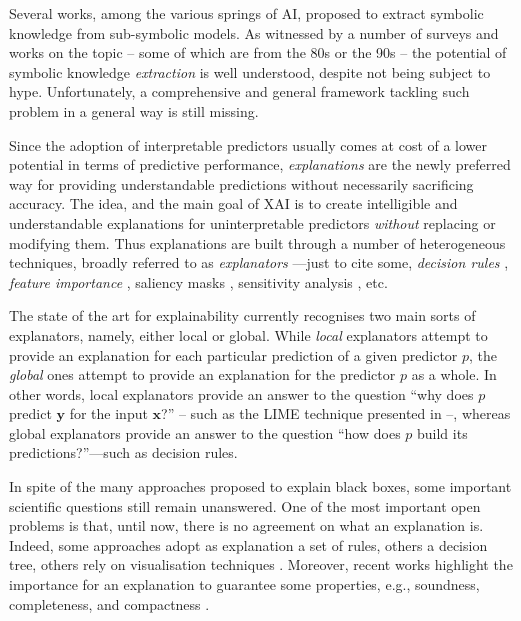 \documentclass[12pt,a4paper,openright,twoside]{book}
\begin{document}
Several works, among the various springs of AI, proposed to extract symbolic knowledge from sub-symbolic models.
%
As witnessed by a number of surveys \cite{GuidottiMRTGP19, GarcezBRFHIKLMS15, AndrewsDT95, GarcezBG01} and works on the topic \cite{BolognaH18, BolognaH16, FrosstH17, JohanssonN09, KrishnanSB1999, HruschkaE2006, ZhouZYS1983, CravenS95, AugastaK12, SatoT2002, KahramanliA09a} -- some of which are from the 80s or the 90s -- the potential of symbolic knowledge \emph{extraction} is well understood, despite not being subject to hype.
%
Unfortunately, a comprehensive and general framework tackling such problem in a general way is still missing.


Since the adoption of interpretable predictors usually comes at cost of a lower potential in terms of predictive performance, \emph{explanations} are the newly preferred way for providing understandable predictions without necessarily sacrificing accuracy.
%
The idea, and the main goal of XAI is to create intelligible and understandable explanations for uninterpretable predictors \emph{without} replacing or modifying them.
%
Thus explanations are built through a number of heterogeneous techniques, broadly referred to as \emph{explanators} \cite{GuidottiMRTGP19}---just to cite some, \emph{decision rules} \cite{Augasta2012}, \emph{feature importance} \cite{tolomei2017interpretable}, saliency masks \cite{FongV17}, sensitivity analysis \cite{SundararajanTY17}, etc.

The state of the art for explainability currently recognises two main sorts of explanators, namely, either local or global. 
%
While \emph{local} explanators attempt to provide an explanation for each particular prediction of a given predictor $p$, the \emph{global} ones attempt to provide an explanation for the predictor $p$ as a whole.
%
In other words, local explanators provide an answer to the question ``why does $p$ predict $\mathbf{y}$ for the input $\mathbf{x}$?'' -- such as the LIME technique presented in \cite{RibeiroSG16} --, whereas global explanators provide an answer to the question ``how does $p$ build its predictions?''---such as decision rules.

In spite of the many approaches proposed to explain black boxes, some important scientific questions still remain unanswered. 
%
One of the most important open problems is that, until now, there is no agreement on what an explanation is. 
%
Indeed, some approaches adopt as explanation a set of rules, others a decision tree, others rely on visualisation techniques \cite{GuidottiMRTGP19}. 
%
Moreover, recent works highlight the importance for an explanation to guarantee some properties, e.g., soundness, completeness, and compactness \cite{GuidottiMRTGP19}. 
\end{document}
